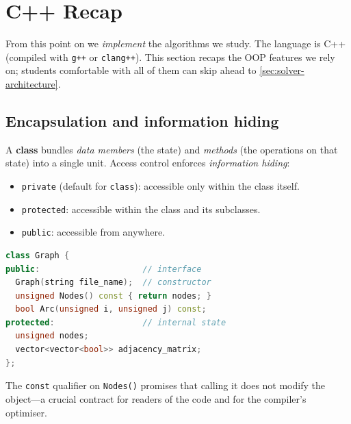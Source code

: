 
\section{C++ Recap}
\label{sec:cpp-recap}

From this point on we \emph{implement} the algorithms we study.
The language is C++ (compiled with \texttt{g++} or
\texttt{clang++}).
This section recaps the OOP features we rely on; students
comfortable with all of them can skip ahead to
\cref{sec:solver-architecture}.

\subsection{Encapsulation and information hiding}
\label{ssec:encapsulation}

A \textbf{class} bundles \emph{data members} (the state) and
\emph{methods} (the operations on that state) into a single unit.
Access control enforces \emph{information hiding}:

\begin{itemize}[nosep]
  \item \texttt{private} (default for \texttt{class}):
    accessible only within the class itself.
  \item \texttt{protected}: accessible within the class and its
    subclasses.
  \item \texttt{public}: accessible from anywhere.
\end{itemize}

\begin{lstlisting}[language=C++, caption={Basic class layout.}]
class Graph {
public:                     // interface
  Graph(string file_name);  // constructor
  unsigned Nodes() const { return nodes; }
  bool Arc(unsigned i, unsigned j) const;
protected:                  // internal state
  unsigned nodes;
  vector<vector<bool>> adjacency_matrix;
};
\end{lstlisting}

\noindent
The \texttt{const} qualifier on \texttt{Nodes()} promises that
calling it does not modify the object---a crucial contract for
readers of the code and for the compiler's optimiser.

